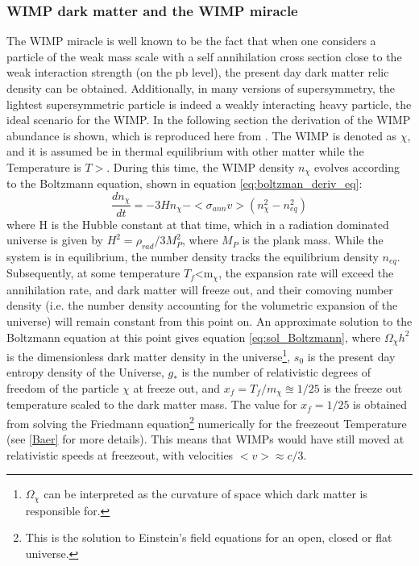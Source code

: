 \subsubsection{WIMP dark matter and the WIMP miracle}\label{sec:IntroWIMPs}
The WIMP miracle is well known to be the fact that when one considers a particle of the weak mass scale with a self annihilation cross section close to the weak interaction strength (on the pb level), the present day dark matter relic density can be obtained. Additionally, in many versions of supersymmetry, the lightest supersymmetric particle is indeed a weakly interacting heavy particle, the ideal scenario for the WIMP\cite{}. In the following section the derivation of the WIMP abundance is shown, which is reproduced here from \cite{Baer-Choi-Kim}. The WIMP is denoted as $\chi$, and it is assumed be in thermal equilibrium with other matter while the Temperature is $T>$\dmm . During this time, the WIMP density $n_\chi$ evolves according to the Boltzmann equation, shown in equation \ref{eq:boltzman_deriv_eq}: 
\begin{equation}\label{eq:boltzman_deriv_eq}
    \frac{dn_\chi}{dt} = -3H n_\chi - <\sigma_{ann}v>(n_\chi^2 - n_{eq}^2)
\end{equation}
where H is the Hubble constant at that time, which in a radiation dominated universe is given by $H^2 = \rho_{rad}/3M^2_P$, where $M_P$ is the plank mass. While the system is in equilibrium, the number density tracks the equilibrium density $n_{eq}$. Subsequently, at some temperature $T_f$<m$_\chi$, the expansion rate will exceed the annihilation rate, and dark matter will freeze out, and their comoving number density (i.e. the number density accounting for the volumetric expansion of the universe) will remain constant from this point on. An approximate solution to the Boltzmann equation at this point gives equation \ref{eq:sol_Boltzmann}, where $\Omega_\chi h^2$ is the dimensionless dark matter density in the universe\footnote{$\Omega_\chi$ can be interpreted as the curvature of space which dark matter is responsible for.}, $s_0$ is the present day entropy density of the Universe, $g_*$ is the number of relativistic degrees of freedom of the particle $\chi$ at freeze out, and $x_f = T_f/m_\chi \approxeq 1/25$ is the freeze out temperature scaled to the dark matter mass. The value for $x_f=1/25$ is obtained from solving the Friedmann equation\footnote{This is the solution to Einstein's field equations for an open, closed or flat universe.} numerically for the freezeout Temperature (see \ref{Baer} for more details). This means that WIMPs would have still moved at relativistic speeds at freezeout, with velocities $<v>\approx c/3$. 

